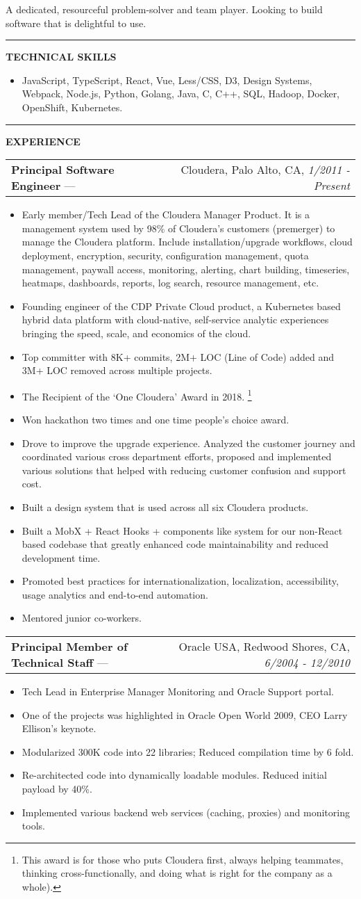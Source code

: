 \documentclass[11pt]{article}
\makeatletter
\newcommand{\resheading}[1]{\vspace{1pt}\textbf{#1}}
\newcommand{\ressubheading}[4]{\vspace{6pt}
    \begin{tabular*}{\textwidth}{@{}l@{\extracolsep{\fill}}r@{}}
        \textbf{#1} --- & #3, #2, \textit{#4} \\
\end{tabular*}}
\newcommand{\resitem}[1]{\item #1}
\newcommand{\ressep}{\vspace{4pt}\hrule\vspace{4pt}}
\makeatother
\begin{document}
A dedicated, resourceful problem-solver and team player. Looking to build software that is delightful to use.

\ressep{}
\resheading{TECHNICAL SKILLS}
\begin{itemize}
\resitem{JavaScript, TypeScript, React, Vue, Less/CSS, D3, Design Systems, Webpack, Node.js, Python, Golang, Java, C, C++, SQL, Hadoop, Docker, OpenShift, Kubernetes.}
\end{itemize}

\ressep{}
\resheading{EXPERIENCE}

\ressubheading{Principal Software Engineer}{Palo Alto, CA}{Cloudera}{1/2011 - Present}
\begin{itemize}
\resitem{Early member/Tech Lead of the Cloudera Manager Product. It is a management system used by 98\% of Cloudera's customers (premerger) to manage the Cloudera platform.
Include installation/upgrade workflows, cloud deployment, encryption, security, configuration management, quota management, paywall access, monitoring, alerting, chart building, timeseries, heatmaps, dashboards, reports, log search, resource management, etc.}
\resitem{Founding engineer of the CDP Private Cloud product, a Kubernetes based hybrid data platform with cloud-native, self-service analytic experiences bringing the speed, scale, and economics of the cloud.}
\resitem{Top committer with 8K+ commits, 2M+ LOC (Line of Code) added and 3M+ LOC removed across multiple projects.}
        \resitem{The Recipient of the `One Cloudera' Award in 2018. \footnote{This award is for those who puts Cloudera first, always helping teammates, thinking cross-functionally, and doing what is right for the company as a whole).}}
\resitem{Won hackathon two times and one time people's choice award.}
\resitem{Drove to improve the upgrade experience. Analyzed the customer journey and coordinated various cross department efforts, proposed and implemented various solutions that helped with reducing customer confusion and support cost.}
\resitem{Built a design system that is used across all six Cloudera products.}
\resitem{Built a MobX + React Hooks + components like system for our non-React based codebase that greatly enhanced code maintainability and reduced development time.}
\resitem{Promoted best practices for internationalization, localization, accessibility, usage analytics and end-to-end automation.}
\resitem{Mentored junior co-workers.}
\end{itemize}

\ressubheading{Principal Member of Technical Staff}{Redwood Shores, CA}{Oracle USA}{6/2004 - 12/2010}
\begin{itemize}
\resitem{Tech Lead in Enterprise Manager Monitoring and Oracle Support portal.}
\resitem{One of the projects was highlighted in Oracle Open World 2009, CEO Larry Ellison's keynote.}
\resitem{Modularized 300K code into 22 libraries; Reduced compilation time by 6 fold.}
\resitem{Re-architected code into dynamically loadable modules. Reduced initial payload by 40\%.}
\resitem{Implemented various backend web services (caching, proxies) and monitoring tools.}
\end{itemize}
\end{document}
